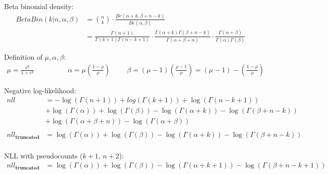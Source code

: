 \documentclass[12pt,a4paper, fleqn]{article}
\author{Ines Scheller}
\begin{document}
Beta binomial density:
\begin{align*}
BetaBin(k | n, \alpha, \beta) &= \binom{n}{k} \cdot \frac{Be(\alpha + k, \beta + n -k)}{Be(\alpha, \beta)} \\
&= \frac{\Gamma(n+1)}{\Gamma(k+1)\Gamma(n-k+1)} \cdot \frac{\Gamma(\alpha + k)\Gamma(\beta + n - k)}{\Gamma(\alpha + \beta + n)} \cdot \frac{\Gamma(\alpha + \beta)}{\Gamma(\alpha)\Gamma(\beta)}
\end{align*}


Definition of $\mu, \alpha, \beta$: 
\begin{align*}
\mu = \frac{e^y}{1 + e^y} \hspace{2cm} \alpha = \mu \left(\frac{1-\rho}{\rho}\right) \hspace{1cm} \beta = (\mu - 1)\left(\frac{\rho - 1}{\rho}\right) = (\mu - 1) - \left(\frac{1 - \rho}{\rho}\right)
\end{align*}

Negative log-likelihood:
\begin{align*}
nll &= - \log( \Gamma(n+1)) + log(\Gamma(k+1)) + \log(\Gamma(n-k+1)) \\
	&+ \log(\Gamma(\alpha)) + \log(\Gamma(\beta)) - \log(\Gamma(\alpha+k)) - \log(\Gamma(\beta+n-k)) \\
&+ \log(\Gamma(\alpha + \beta + n)) - \log(\Gamma(\alpha + \beta)) \\ \ \\
nll_{\textbf{truncated}} &= \log(\Gamma(\alpha)) + \log(\Gamma(\beta)) - \log(\Gamma(\alpha+k)) - \log(\Gamma(\beta+n-k)) \\
\end{align*}

NLL with pseudocounts ($k+1$, $n+2$):
\begin{align*}
nll_{\textbf{truncated}} &= \log(\Gamma(\alpha)) + \log(\Gamma(\beta)) - \log(\Gamma(\alpha+k+1)) - \log(\Gamma(\beta+n-k+1)) \\
\end{align*}
\end{document}
